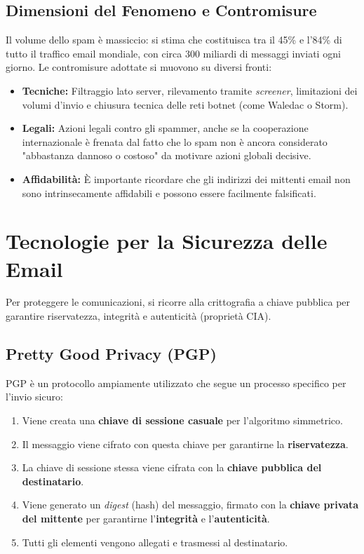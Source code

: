 \documentclass{article}
\begin{document}
\subsection*{Dimensioni del Fenomeno e Contromisure}

Il volume dello spam è massiccio: si stima che costituisca tra il 45\% e l'84\% di tutto il traffico email mondiale, con circa 300 miliardi di messaggi inviati ogni giorno. Le contromisure adottate si muovono su diversi fronti:

\begin{itemize}
    \item \textbf{Tecniche:} Filtraggio lato server, rilevamento tramite \textit{screener}, limitazioni dei volumi d'invio e chiusura tecnica delle reti botnet (come Waledac o Storm).
    \item \textbf{Legali:} Azioni legali contro gli spammer, anche se la cooperazione internazionale è frenata dal fatto che lo spam non è ancora considerato "abbastanza dannoso o costoso" da motivare azioni globali decisive.
    \item \textbf{Affidabilità:} È importante ricordare che gli indirizzi dei mittenti email non sono intrinsecamente affidabili e possono essere facilmente falsificati.
\end{itemize}

\vspace{0.8cm}

\section*{Tecnologie per la Sicurezza delle Email}

Per proteggere le comunicazioni, si ricorre alla crittografia a chiave pubblica per garantire riservatezza, integrità e autenticità (proprietà CIA).

\subsection*{Pretty Good Privacy (PGP)}

PGP è un protocollo ampiamente utilizzato che segue un processo specifico per l'invio sicuro:

\begin{enumerate}
    \item Viene creata una \textbf{chiave di sessione casuale} per l'algoritmo simmetrico.
    \item Il messaggio viene cifrato con questa chiave per garantirne la \textbf{riservatezza}.
    \item La chiave di sessione stessa viene cifrata con la \textbf{chiave pubblica del destinatario}.
    \item Viene generato un \textit{digest} (hash) del messaggio, firmato con la \textbf{chiave privata del mittente} per garantirne l'\textbf{integrità} e l'\textbf{autenticità}.
    \item Tutti gli elementi vengono allegati e trasmessi al destinatario.
\end{enumerate}
\end{document}
